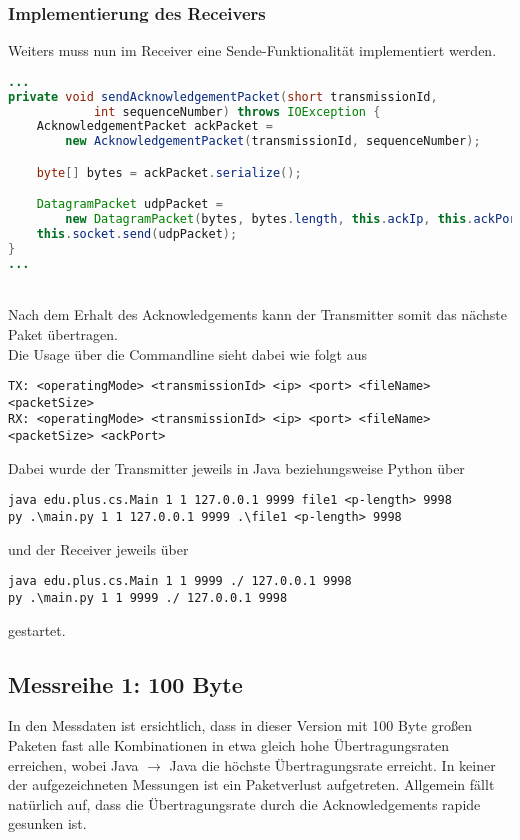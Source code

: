 \documentclass{article}
\begin{document}
    \subsubsection*{Implementierung des Receivers}
    Weiters muss nun im Receiver eine Sende-Funktionalität implementiert werden.
    \begin{lstlisting}[language=Java]
...
private void sendAcknowledgementPacket(short transmissionId,
            int sequenceNumber) throws IOException {
    AcknowledgementPacket ackPacket =
        new AcknowledgementPacket(transmissionId, sequenceNumber);

    byte[] bytes = ackPacket.serialize();

    DatagramPacket udpPacket =
        new DatagramPacket(bytes, bytes.length, this.ackIp, this.ackPort);
    this.socket.send(udpPacket);
}
...
    \end{lstlisting} \\
    Nach dem Erhalt des Acknowledgements kann der Transmitter somit das nächste Paket übertragen.\\
    Die Usage über die Commandline sieht dabei wie folgt aus
    \begin{lstlisting}
TX: <operatingMode> <transmissionId> <ip> <port> <fileName>
<packetSize>
RX: <operatingMode> <transmissionId> <ip> <port> <fileName>
<packetSize> <ackPort>
    \end{lstlisting}
    Dabei wurde der Transmitter jeweils in Java beziehungsweise Python über
    \begin{lstlisting}
java edu.plus.cs.Main 1 1 127.0.0.1 9999 file1 <p-length> 9998
py .\main.py 1 1 127.0.0.1 9999 .\file1 <p-length> 9998
    \end{lstlisting}und der Receiver jeweils über
    \begin{lstlisting}
java edu.plus.cs.Main 1 1 9999 ./ 127.0.0.1 9998
py .\main.py 1 1 9999 ./ 127.0.0.1 9998
    \end{lstlisting}
    gestartet.

    \subsection{Messreihe 1: 100 Byte}
    In den Messdaten ist ersichtlich, dass in dieser Version mit 100 Byte großen Paketen fast alle Kombinationen in etwa
    gleich hohe Übertragungsraten erreichen, wobei Java $\rightarrow$ Java die höchste Übertragungsrate erreicht.
    In keiner der aufgezeichneten Messungen ist ein Paketverlust aufgetreten.
    Allgemein fällt natürlich auf, dass die Übertragungsrate durch die Acknowledgements rapide gesunken ist.
\end{document}
